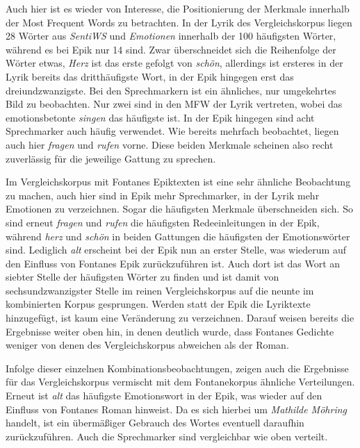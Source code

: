 \documentclass[a4paper,10p]{article}
\begin{document}
Auch hier ist es wieder von Interesse, die Positionierung der Merkmale innerhalb der Most Frequent Words zu betrachten. In der Lyrik des Vergleichskorpus liegen 28 Wörter aus \textit{SentiWS} und \textit{Emotionen} innerhalb der 100 häufigsten Wörter, während es bei Epik nur 14 sind. Zwar überschneidet sich die Reihenfolge der Wörter etwas, \textit{Herz} ist das erste gefolgt von \textit{schön}, allerdings ist ersteres in der Lyrik bereits das dritthäufigste Wort, in der Epik hingegen erst das dreiundzwanzigste. Bei den Sprechmarkern ist ein ähnliches, nur umgekehrtes Bild zu beobachten. Nur zwei sind in den MFW der Lyrik vertreten, wobei das emotionsbetonte \textit{singen} das häufigste ist. In der Epik hingegen sind acht Sprechmarker auch häufig verwendet. Wie bereits mehrfach beobachtet, liegen auch hier \textit{fragen} und \textit{rufen} vorne. Diese beiden Merkmale scheinen also recht zuverlässig für die jeweilige Gattung zu sprechen. \par 

Im Vergleichskorpus mit Fontanes Epiktexten ist eine sehr ähnliche Beobachtung zu machen, auch hier sind in Epik mehr Sprechmarker, in der Lyrik mehr Emotionen zu verzeichnen. Sogar die häufigsten Merkmale überschneiden sich. So sind erneut \textit{fragen} und \textit{rufen} die häufigsten Redeeinleitungen in der Epik, während \textit{herz} und \textit{schön} in beiden Gattungen die häufigsten der Emotionswörter sind. Lediglich \textit{alt} erscheint bei der Epik nun an erster Stelle, was wiederum auf den Einfluss von Fontanes Epik zurückzuführen ist. Auch dort ist das Wort an siebter Stelle der häufigsten Wörter zu finden und ist damit von sechsundzwanzigster Stelle im reinen Vergleichskorpus auf die neunte im kombinierten Korpus gesprungen. Werden statt der Epik die Lyriktexte hinzugefügt, ist kaum eine Veränderung zu verzeichnen. Darauf weisen bereits die Ergebnisse weiter oben hin, in denen deutlich wurde, dass Fontanes Gedichte weniger von denen des Vergleichskorpus abweichen als der Roman. \par 

Infolge dieser einzelnen Kombinationsbeobachtungen, zeigen auch die Ergebnisse für das Vergleichskorpus vermischt mit dem Fontanekorpus ähnliche Verteilungen. Erneut ist \textit{alt} das häufigste Emotionswort in der Epik, was wieder auf den Einfluss von Fontanes Roman hinweist. Da es sich hierbei um \textit{Mathilde Möhring} handelt, ist ein übermäßiger Gebrauch des Wortes eventuell daraufhin zurückzuführen. Auch die Sprechmarker sind vergleichbar wie oben verteilt. \par 
\end{document}
